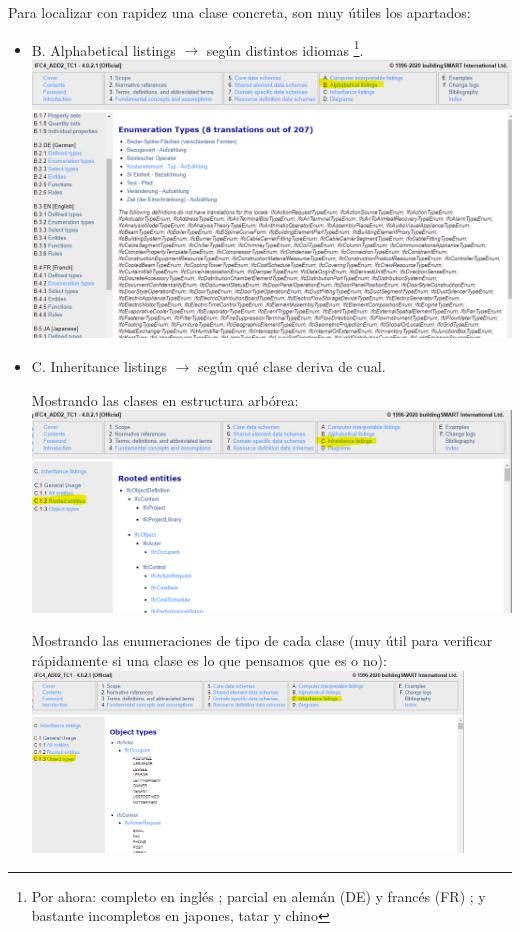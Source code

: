 \documentclass[spanish,10pt,a4paper,final,oneside]{article}
\begin{document}
\newpage
\vspace{0.5cm}
Para localizar con rapidez una clase concreta, son muy útiles los apartados:
\begin{itemize}

\item B. Alphabetical listings $\rightarrow$ según distintos idiomas \footnote{Por ahora: completo en inglés ; parcial en alemán (DE) y francés (FR) ; y bastante incompletos en japones, tatar y chino}.
\\ 

\includegraphics[width=\textwidth]{IFC4 - B - Alphabetical listings}

\item C. Inheritance listings $\rightarrow$ según qué clase deriva de cual.

Mostrando las clases en estructura arbórea:
\\ \includegraphics[width=\textwidth]{IFC4 - C - Inheritance listings - Rooted entities}

Mostrando las enumeraciones de tipo de cada clase (muy útil para verificar rápidamente si una clase es lo que pensamos que es o no):
\\ \includegraphics[width=0.9\textwidth]{IFC4 - C - Inheritance listings - Object types}


\end{itemize}
\end{document}
